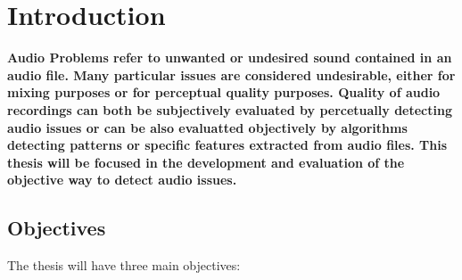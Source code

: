 \normallinespacing

\chapter{Introduction}

\bf Audio Problems \rm refer to unwanted or undesired sound contained in an audio file. Many particular issues are considered undesirable, either for mixing purposes or for perceptual quality purposes. Quality of audio recordings can both be subjectively evaluated by percetually detecting audio issues or can be also evaluatted objectively by algorithms detecting patterns or specific features extracted from audio files. This thesis will be focused in the development and evaluation of the objective way to detect audio issues. 

\section{Objectives}
The thesis will have three main objectives:
